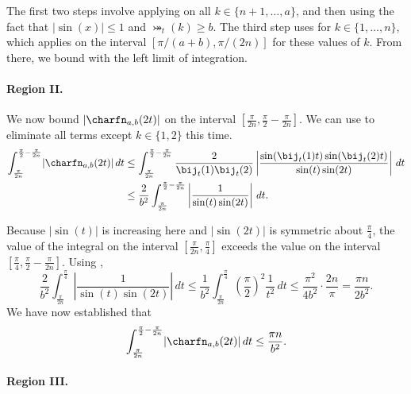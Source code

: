 \documentclass{toc}
\begin{document}
The first two steps involve applying  on all $k \in \{n+1,\dots,a\}$, and then using the fact that $\lvert\sin(x)\rvert\le 1$ and $\bij_t(k)\ge b$. The third step uses  for $k \in \{1,\dots,n\}$, which applies on the interval $[\pi/(a+b),\pi/(2n)]$ for these values of $k$. From there, we bound with the left limit of integration.

\paragraph{Region II.}

We now bound $\lvert\charfn_{a,b}(2t)\rvert$ on the interval $[\frac{\pi}{2n},\frac{\pi}{2}-\frac{\pi}{2n}]$. We can use  to eliminate all terms except $k \in \{1,2\}$ this time.
\begin{align*}
    \int_{\frac{\pi}{2n}}^{\frac{\pi}{2}-\frac{\pi}{2n}} \lvert\charfn_{a,b}(2t)\rvert\,dt &\le \int_{\frac{\pi}{2n}}^{\frac{\pi}{2}-\frac{\pi}{2n}} \frac{2}{\bij_t(1)\bij_t(2)} \left\lvert\frac{\sin(\bij_t(1)t)\sin(\bij_t(2)t)}{\sin(t)\sin(2t)} \right\rvert\,dt\\
    &\le \frac{2}{b^2}\int_{\frac{\pi}{2n}}^{\frac{\pi}{2}-\frac{\pi}{2n}} \left\lvert\frac{1}{\sin(t)\sin(2t)} \right\rvert\,dt.
\end{align*}

Because $\lvert\sin(t)\rvert$ is increasing here and $\lvert\sin(2t)\rvert$ is symmetric about $\frac{\pi}{4}$, the value of the integral on the interval $[\frac{\pi}{2n},\frac{\pi}{4}]$ exceeds the value on the interval $[\frac{\pi}{4},\frac{\pi}{2}-\frac{\pi}{2n}]$. Using ,
\[\frac{2}{b^2}\int_{\frac{\pi}{2n}}^{\frac{\pi}{4}} \left\lvert\frac{1}{\sin(t)\sin(2t)} \right\rvert\,dt
\le \frac{1}{b^2}\int_{\frac{\pi}{2n}}^{\frac{\pi}{4}} \left(\frac{\pi}{2}\right)^2 \frac{1}{t^2}\,dt
\le  \frac{\pi^2}{4b^2}\cdot \frac{2n}{\pi}
=\frac{\pi n}{2b^2}.\]
We have now established that
\[\int_{\frac{\pi}{2n}}^{\frac{\pi}{2}-\frac{\pi}{2n}} \lvert\charfn_{a,b}(2t)\rvert\,dt \le \frac{\pi n}{b^2}.\]

\paragraph{Region III.}
\end{document}
